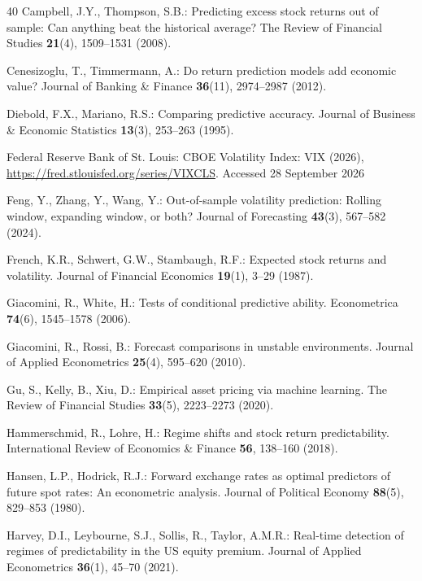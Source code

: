 \documentclass[runningheads,orivec]{llncs}
\begin{document}
\begin{thebibliography}{40}
Campbell, J.Y., Thompson, S.B.: Predicting excess stock returns out of sample: Can anything beat the historical average? The Review of Financial Studies \textbf{21}(4), 1509--1531 (2008).

Cenesizoglu, T., Timmermann, A.: Do return prediction models add economic value? Journal of Banking \& Finance \textbf{36}(11), 2974--2987 (2012).

Diebold, F.X., Mariano, R.S.: Comparing predictive accuracy. Journal of Business \& Economic Statistics \textbf{13}(3), 253--263 (1995).

Federal Reserve Bank of St. Louis: CBOE Volatility Index: VIX (2026), \url{https://fred.stlouisfed.org/series/VIXCLS}. Accessed 28 September 2026

Feng, Y., Zhang, Y., Wang, Y.: Out-of-sample volatility prediction: Rolling window, expanding window, or both? Journal of Forecasting \textbf{43}(3), 567--582 (2024).

French, K.R., Schwert, G.W., Stambaugh, R.F.: Expected stock returns and volatility. Journal of Financial Economics \textbf{19}(1), 3--29 (1987).

Giacomini, R., White, H.: Tests of conditional predictive ability. Econometrica \textbf{74}(6), 1545--1578 (2006).

Giacomini, R., Rossi, B.: Forecast comparisons in unstable environments. Journal of Applied Econometrics \textbf{25}(4), 595--620 (2010).

Gu, S., Kelly, B., Xiu, D.: Empirical asset pricing via machine learning. The Review of Financial Studies \textbf{33}(5), 2223--2273 (2020).

Hammerschmid, R., Lohre, H.: Regime shifts and stock return predictability. International Review of Economics \& Finance \textbf{56}, 138--160 (2018).

Hansen, L.P., Hodrick, R.J.: Forward exchange rates as optimal predictors of future spot rates: An econometric analysis. Journal of Political Economy \textbf{88}(5), 829--853 (1980).

Harvey, D.I., Leybourne, S.J., Sollis, R., Taylor, A.M.R.: Real-time detection of regimes of predictability in the US equity premium. Journal of Applied Econometrics \textbf{36}(1), 45--70 (2021).


\end{thebibliography}
\end{document}
